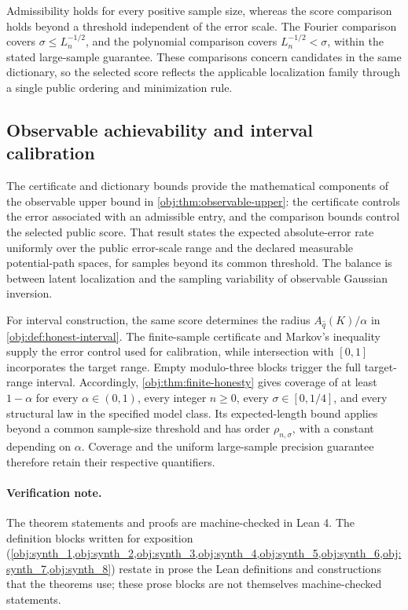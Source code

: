 Admissibility holds for every positive sample size, whereas the score comparison holds beyond a threshold independent of the error scale. The Fourier comparison covers \(\sigma\le L_n^{-1/2}\), and the polynomial comparison covers \(L_n^{-1/2}<\sigma\), within the stated large-sample guarantee. These comparisons concern candidates in the same dictionary, so the selected score reflects the applicable localization family through a single public ordering and minimization rule.

\subsection{Observable achievability and interval calibration}

The certificate and dictionary bounds provide the mathematical components of the observable upper bound in \cref{obj:thm:observable-upper}: the certificate controls the error associated with an admissible entry, and the comparison bounds control the selected public score. That result states the expected absolute-error rate uniformly over the public error-scale range and the declared measurable potential-path spaces, for samples beyond its common threshold. The balance is between latent localization and the sampling variability of observable Gaussian inversion.

For interval construction, the same score determines the radius \(A_{\widehat q}(K)/\alpha\) in \cref{obj:def:honest-interval}. The finite-sample certificate and Markov's inequality supply the error control used for calibration, while intersection with \([0,1]\) incorporates the target range. Empty modulo-three blocks trigger the full target-range interval. Accordingly, \cref{obj:thm:finite-honesty} gives coverage of at least \(1-\alpha\) for every \(\alpha\in(0,1)\), every integer \(n\ge0\), every \(\sigma\in[0,1/4]\), and every structural law in the specified model class. Its expected-length bound applies beyond a common sample-size threshold and has order \(\rho_{n,\sigma}\), with a constant depending on \(\alpha\). Coverage and the uniform large-sample precision guarantee therefore retain their respective quantifiers.

\paragraph{Verification note.}
The theorem statements and proofs are machine-checked in Lean 4. The definition blocks written for exposition (\cref{obj:synth_1,obj:synth_2,obj:synth_3,obj:synth_4,obj:synth_5,obj:synth_6,obj:synth_7,obj:synth_8}) restate in prose the Lean definitions and constructions that the theorems use; these prose blocks are not themselves machine-checked statements.
